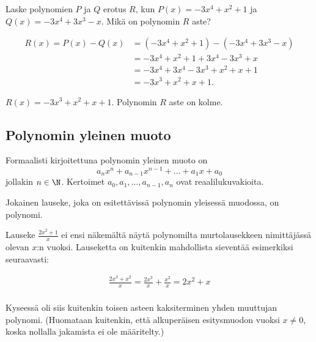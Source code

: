 \begin{esimerkki}
    Laske polynomien $P$ ja $Q$ erotus $R$, kun $P(x)=-3x^4+x^2+1$ ja $Q(x)=-3x^4+3x^3-x$.
    Mikä on polynomin $R$ aste?
   \begin{esimratk}
        \begin{align*}
            R(x) = P(x)-Q(x) &= (-3x^4+x^2+1)-(-3x^4+3x^3-x) \\
                             &= -3x^4+x^2+1+3x^4-3x^3+x \\
                             &= -3x^4+3x^4-3x^3+x^2+x+1 \\
                             &= -3x^3+x^2+x+1.
        \end{align*}
    \end{esimratk}
    \begin{esimvast}
        $R(x) = -3x^3+x^2+x+1$. Polynomin $R$ aste on kolme.
    \end{esimvast}
\end{esimerkki}

\subsection*{Polynomin yleinen muoto}

Formaalisti kirjoitettuna polynomin yleinen muoto on
\[
a_n x^n + a_{n-1} x^{n-1} + \ldots + a_1 x + a_0 \] 
jollakin $n\in\N$. Kertoimet $a_0, a_1, \ldots, a_{n-1}, a_n$ ovat reaalilukuvakioita.
 
Jokainen lauseke, joka on esitettävissä polynomin yleisessä muodossa, on polynomi.

\begin{esimerkki}

Lauseke $\frac{2x^2+1}{x}$ ei ensi näkemältä näytä polynomilta murtolausekkeen nimittäjässä olevan $x$:n vuoksi. Lauseketta on kuitenkin mahdollista sieventää esimerkiksi seuraavasti:

  \begin{align*}
            
            \frac{2x^3+x^2}{x} = \frac{2x^3}{x}+\frac{x^2}{x} = 2x^2+x \\ 
            
        \end{align*}

Kyseessä oli siis kuitenkin toisen asteen kaksiterminen yhden muuttujan polynomi. (Huomataan kuitenkin, että alkuperäisen esitysmuodon vuoksi $x \neq 0$, koska nollalla jakamista ei ole määritelty.)

\end{esimerkki}

